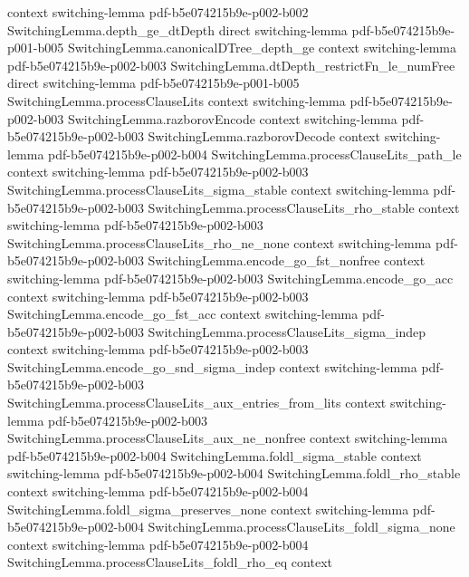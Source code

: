 \begin{theorem}
  {context}
  {switching-lemma}
  {pdf-b5e074215b9e-p002-b002}
\proofstep
  {SwitchingLemma.depth_ge_dtDepth}
  {direct}
  {switching-lemma}
  {pdf-b5e074215b9e-p001-b005}
\proofstep
  {SwitchingLemma.canonicalDTree_depth_ge}
  {context}
  {switching-lemma}
  {pdf-b5e074215b9e-p002-b003}
\proofstep
  {SwitchingLemma.dtDepth_restrictFn_le_numFree}
  {direct}
  {switching-lemma}
  {pdf-b5e074215b9e-p001-b005}
\proofstep
  {SwitchingLemma.processClauseLits}
  {context}
  {switching-lemma}
  {pdf-b5e074215b9e-p002-b003}
\proofstep
  {SwitchingLemma.razborovEncode}
  {context}
  {switching-lemma}
  {pdf-b5e074215b9e-p002-b003}
\proofstep
  {SwitchingLemma.razborovDecode}
  {context}
  {switching-lemma}
  {pdf-b5e074215b9e-p002-b004}
\proofstep
  {SwitchingLemma.processClauseLits_path_le}
  {context}
  {switching-lemma}
  {pdf-b5e074215b9e-p002-b003}
\proofstep
  {SwitchingLemma.processClauseLits_sigma_stable}
  {context}
  {switching-lemma}
  {pdf-b5e074215b9e-p002-b003}
\proofstep
  {SwitchingLemma.processClauseLits_rho_stable}
  {context}
  {switching-lemma}
  {pdf-b5e074215b9e-p002-b003}
\proofstep
  {SwitchingLemma.processClauseLits_rho_ne_none}
  {context}
  {switching-lemma}
  {pdf-b5e074215b9e-p002-b003}
\proofstep
  {SwitchingLemma.encode_go_fst_nonfree}
  {context}
  {switching-lemma}
  {pdf-b5e074215b9e-p002-b003}
\proofstep
  {SwitchingLemma.encode_go_acc}
  {context}
  {switching-lemma}
  {pdf-b5e074215b9e-p002-b003}
\proofstep
  {SwitchingLemma.encode_go_fst_acc}
  {context}
  {switching-lemma}
  {pdf-b5e074215b9e-p002-b003}
\proofstep
  {SwitchingLemma.processClauseLits_sigma_indep}
  {context}
  {switching-lemma}
  {pdf-b5e074215b9e-p002-b003}
\proofstep
  {SwitchingLemma.encode_go_snd_sigma_indep}
  {context}
  {switching-lemma}
  {pdf-b5e074215b9e-p002-b003}
\proofstep
  {SwitchingLemma.processClauseLits_aux_entries_from_lits}
  {context}
  {switching-lemma}
  {pdf-b5e074215b9e-p002-b003}
\proofstep
  {SwitchingLemma.processClauseLits_aux_ne_nonfree}
  {context}
  {switching-lemma}
  {pdf-b5e074215b9e-p002-b004}
\proofstep
  {SwitchingLemma.foldl_sigma_stable}
  {context}
  {switching-lemma}
  {pdf-b5e074215b9e-p002-b004}
\proofstep
  {SwitchingLemma.foldl_rho_stable}
  {context}
  {switching-lemma}
  {pdf-b5e074215b9e-p002-b004}
\proofstep
  {SwitchingLemma.foldl_sigma_preserves_none}
  {context}
  {switching-lemma}
  {pdf-b5e074215b9e-p002-b004}
\proofstep
  {SwitchingLemma.processClauseLits_foldl_sigma_none}
  {context}
  {switching-lemma}
  {pdf-b5e074215b9e-p002-b004}
\proofstep
  {SwitchingLemma.processClauseLits_foldl_rho_eq}
  {context}

\end{theorem}
